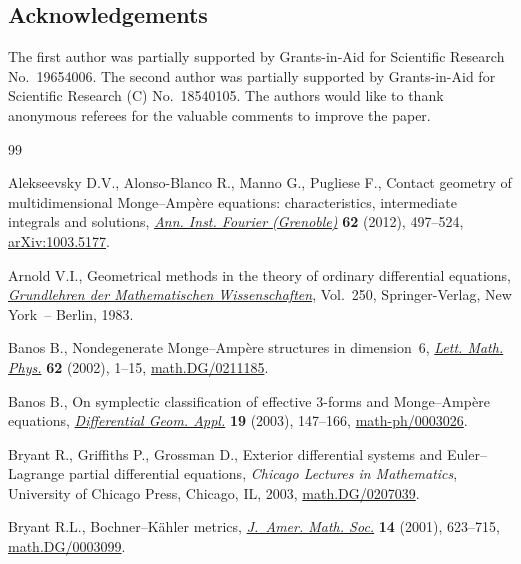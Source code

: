 \documentclass[pdftex]{sigma}
\begin{document}
\subsection*{Acknowledgements}

{\sloppy The f\/irst author was partially supported by
Grants-in-Aid for Scientif\/ic Research No.~19654006.
The second author was partially supported by
Grants-in-Aid for Scientif\/ic Research (C) No.~18540105.
The authors would like to thank anonymous referees for the valuable
comments to improve the paper. %

}

\begin{thebibliography}{99}
\footnotesize\itemsep=-0.5pt
\providecommand{\eprint}[2][]{\href{http://arxiv.org/abs/#2}{arXiv:#2}}

Alekseevsky D.V., Alonso-Blanco R., Manno G., Pugliese F., Contact geometry of
  multidimensional {M}onge--{A}mp\`ere equations: characteristics, intermediate
  integrals and solutions, \href{http://dx.doi.org/10.5802/aif.2686}{\textit{Ann. Inst. Fourier (Grenoble)}} \textbf{62}
  (2012), 497--524, \href{http://arxiv.org/abs/1003.5177}{arXiv:1003.5177}.

Arnold V.I., Geometrical methods in the theory of ordinary dif\/ferential
  equations, \href{http://dx.doi.org/10.1007/978-1-4612-1037-5}{\textit{Grundlehren der Mathematischen Wissenschaften}}, Vol.~250,
  Springer-Verlag, New York~-- Berlin, 1983.

Banos B., Nondegenerate {M}onge--{A}mp\`ere structures in dimension~6,
  \href{http://dx.doi.org/10.1023/A:1021655609692}{\textit{Lett. Math. Phys.}} \textbf{62} (2002), 1--15,
  \href{http://arxiv.org/abs/math.DG/0211185}{math.DG/0211185}.

Banos B., On symplectic classif\/ication of ef\/fective 3-forms and
  {M}onge--{A}mp\`ere equations, \href{http://dx.doi.org/10.1016/S0926-2245(03)00017-2}{\textit{Differential Geom. Appl.}} \textbf{19}
  (2003), 147--166, \href{http://arxiv.org/abs/math-ph/0003026}{math-ph/0003026}.

Bryant R., Grif\/f\/iths P., Grossman D., Exterior dif\/ferential systems and
  {E}uler--{L}agrange partial dif\/ferential equations, \textit{Chicago Lectures in
  Mathematics}, University of Chicago Press, Chicago, IL, 2003,
  \href{http://arxiv.org/abs/math.DG/0207039}{math.DG/0207039}.

Bryant R.L., Bochner--{K}\"ahler metrics, \href{http://dx.doi.org/10.1090/S0894-0347-01-00366-6}{\textit{J.~Amer. Math. Soc.}}
  \textbf{14} (2001), 623--715, \href{http://arxiv.org/abs/math.DG/0003099}{math.DG/0003099}.


\end{thebibliography}
\end{document}
